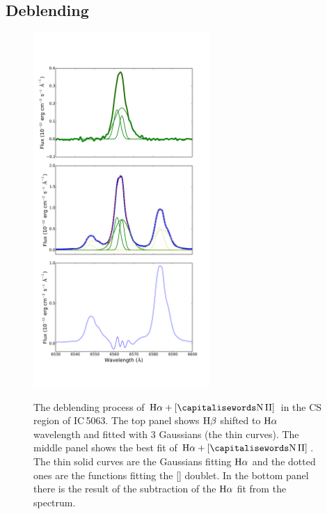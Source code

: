 \documentclass[../main.tex]{subfiles}
\begin{document}
\subsection{Deblending}
\label{sec:deblending}

\begin{figure}
\centering
\includegraphics[width=0.6\textwidth]{images/paper1/ha2.pdf} \\
\caption[]{The deblending process of $\Ha + [\ion{N}{II}]$ in the CS region of IC\,5063. The top panel shows $\rm H\beta$ shifted to $\rm H\alpha$ wavelength and fitted with $3$ Gaussians (the thin curves). The middle panel shows the best fit of $\Ha+[\ion{N}{II}]$. The thin solid curves are the Gaussians fitting $\rm H\alpha$ and the dotted ones are the functions fitting the [] doublet. In the bottom panel there is the result of the subtraction of the $\rm H\alpha$ fit from the spectrum. }
\label{fig:hadeb}
\end{figure}
\end{document}
